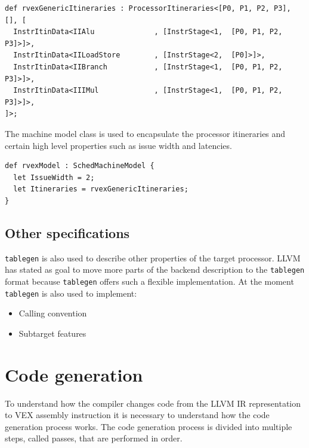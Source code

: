 \begin{lstlisting}[language=tblgen]
def rvexGenericItineraries : ProcessorItineraries<[P0, P1, P2, P3], [], [
  InstrItinData<IIAlu              , [InstrStage<1,  [P0, P1, P2, P3]>]>,
  InstrItinData<IILoadStore        , [InstrStage<2,  [P0]>]>,
  InstrItinData<IIBranch           , [InstrStage<1,  [P0, P1, P2, P3]>]>,
  InstrItinData<IIIMul             , [InstrStage<1,  [P0, P1, P2, P3]>]>,
]>;
\end{lstlisting}

The machine model class is used to encapsulate the processor itineraries and certain high level properties such as issue width and latencies.

\begin{lstlisting}[language=tblgen]
def rvexModel : SchedMachineModel {
  let IssueWidth = 2;
  let Itineraries = rvexGenericItineraries;
}
\end{lstlisting}

\subsection{Other specifications}
\texttt{tablegen} is also used to describe other properties of the target processor. LLVM has stated as goal to move more parts of the backend description to the \texttt{tablegen} format because \texttt{tablegen} offers such a flexible implementation. At the moment \texttt{tablegen} is also used to implement:

\begin{itemize}
	\item Calling convention
	\item Subtarget features
\end{itemize}

\section{Code generation}
To understand how the compiler changes code from the LLVM IR representation to VEX assembly instruction it is necessary to understand how the code generation process works. The code generation process is divided into multiple steps, called passes, that are performed in order. 

